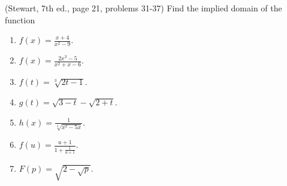 (Stewart, 7th ed., page 21, problems 31-37) Find the implied domain of the function
\begin{multicols}{2}
\begin{enumerate}
\item $f(x)=\frac{x+4}{x^2-9}$. 
\item $f(x)=\frac{2x^3-5}{x^2+x-6}$.
\item $f(t)=\sqrt[3]{2t-1}$.
\item $g(t)=\sqrt{3-t}-\sqrt{2+t}$.
\item $h(x)=\frac{1}{\sqrt[4]{x^2-5x}}$.
\item $f(u)=\frac{u+1}{1+\frac{1}{u+1}}$.
\item $F(p)=\sqrt{2-{\sqrt{p}}}$.
\end{enumerate}
\end{multicols}
